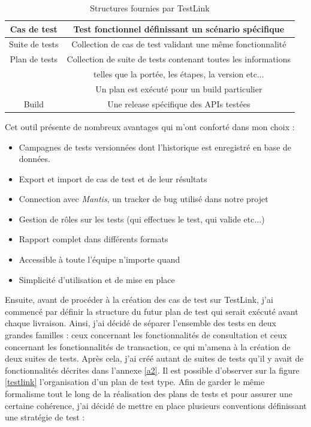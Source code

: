 	\newpage

\begin{table}[h!]
	\center
	\begin{tabular}{| c | c |}
     \hline
     Cas de test & Test fonctionnel définissant un scénario spécifique \\ \hline
     Suite de tests & Collection de cas de test validant une même fonctionnalité \\ \hline
     Plan de tests & Collection de suite de tests contenant toutes les informations \\  & telles que la portée, les étapes, la version etc...\\ & Un plan est exécuté pour un build particulier \\ \hline
     Build & Une release spécifique des APIs testées \\
     \hline
	\end{tabular}
	\caption{Structures fournies par TestLink}
	\label{structuresTestlink}
\end{table}

Cet outil présente de nombreux avantages qui m'ont conforté dans mon choix :
\begin{itemize}
	\item Campagnes de tests versionnées dont l'historique est enregistré en base de données.
	\item Export et import de cas de test et de leur résultats
	\item Connection avec \textit{Mantis}, un tracker de bug utilisé dans notre projet
	\item Gestion de rôles sur les tests (qui effectues le test, qui valide etc...)
	\item Rapport complet dans différents formats
	\item Accessible à toute l'équipe n'importe quand 
	\item Simplicité d'utilisation et de mise en place \\
\end{itemize}

	Ensuite, avant de procéder à la création des cas de test sur TestLink, j'ai commencé par définir la structure du futur plan de test qui serait exécuté avant chaque livraison. Ainsi, j'ai décidé de séparer l'ensemble des tests en deux grandes familles : ceux concernant les fonctionnalités de consultation et ceux concernant les fonctionnalités de transaction, ce qui m'amena à la création de deux suites de tests. Après cela, j'ai créé autant de suites de tests qu'il y avait de fonctionnalités décrites dans l'annexe \ref{a2}. Il est possible d'observer sur la figure \ref{testlink} l'organisation d'un plan de test type. Afin de garder le même formalisme tout le long de la réalisation des plans de tests et pour assurer une certaine cohérence, j'ai décidé de mettre en place plusieurs conventions définissant une stratégie de test :
	
